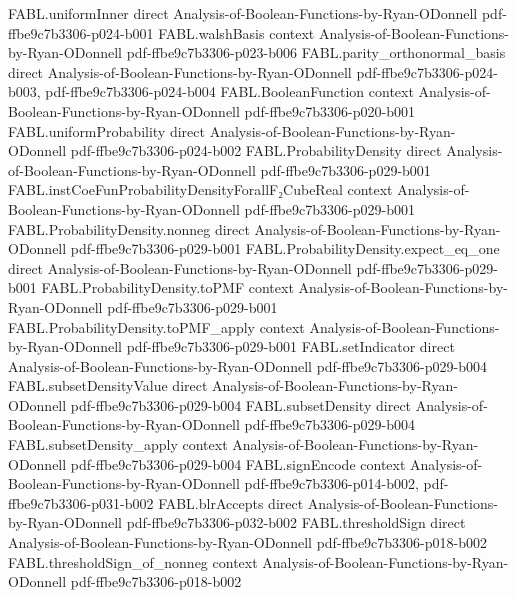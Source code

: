 \begin{theorem}
\proofstep
  {FABL.uniformInner}
  {direct}
  {Analysis-of-Boolean-Functions-by-Ryan-ODonnell}
  {pdf-ffbe9c7b3306-p024-b001}
\proofstep
  {FABL.walshBasis}
  {context}
  {Analysis-of-Boolean-Functions-by-Ryan-ODonnell}
  {pdf-ffbe9c7b3306-p023-b006}
\proofstep
  {FABL.parity_orthonormal_basis}
  {direct}
  {Analysis-of-Boolean-Functions-by-Ryan-ODonnell}
  {pdf-ffbe9c7b3306-p024-b003,
    pdf-ffbe9c7b3306-p024-b004}
\proofstep
  {FABL.BooleanFunction}
  {context}
  {Analysis-of-Boolean-Functions-by-Ryan-ODonnell}
  {pdf-ffbe9c7b3306-p020-b001}
\proofstep
  {FABL.uniformProbability}
  {direct}
  {Analysis-of-Boolean-Functions-by-Ryan-ODonnell}
  {pdf-ffbe9c7b3306-p024-b002}
\proofstep
  {FABL.ProbabilityDensity}
  {direct}
  {Analysis-of-Boolean-Functions-by-Ryan-ODonnell}
  {pdf-ffbe9c7b3306-p029-b001}
\proofstep
  {FABL.instCoeFunProbabilityDensityForallF₂CubeReal}
  {context}
  {Analysis-of-Boolean-Functions-by-Ryan-ODonnell}
  {pdf-ffbe9c7b3306-p029-b001}
\proofstep
  {FABL.ProbabilityDensity.nonneg}
  {direct}
  {Analysis-of-Boolean-Functions-by-Ryan-ODonnell}
  {pdf-ffbe9c7b3306-p029-b001}
\proofstep
  {FABL.ProbabilityDensity.expect_eq_one}
  {direct}
  {Analysis-of-Boolean-Functions-by-Ryan-ODonnell}
  {pdf-ffbe9c7b3306-p029-b001}
\proofstep
  {FABL.ProbabilityDensity.toPMF}
  {context}
  {Analysis-of-Boolean-Functions-by-Ryan-ODonnell}
  {pdf-ffbe9c7b3306-p029-b001}
\proofstep
  {FABL.ProbabilityDensity.toPMF_apply}
  {context}
  {Analysis-of-Boolean-Functions-by-Ryan-ODonnell}
  {pdf-ffbe9c7b3306-p029-b001}
\proofstep
  {FABL.setIndicator}
  {direct}
  {Analysis-of-Boolean-Functions-by-Ryan-ODonnell}
  {pdf-ffbe9c7b3306-p029-b004}
\proofstep
  {FABL.subsetDensityValue}
  {direct}
  {Analysis-of-Boolean-Functions-by-Ryan-ODonnell}
  {pdf-ffbe9c7b3306-p029-b004}
\proofstep
  {FABL.subsetDensity}
  {direct}
  {Analysis-of-Boolean-Functions-by-Ryan-ODonnell}
  {pdf-ffbe9c7b3306-p029-b004}
\proofstep
  {FABL.subsetDensity_apply}
  {context}
  {Analysis-of-Boolean-Functions-by-Ryan-ODonnell}
  {pdf-ffbe9c7b3306-p029-b004}
\proofstep
  {FABL.signEncode}
  {context}
  {Analysis-of-Boolean-Functions-by-Ryan-ODonnell}
  {pdf-ffbe9c7b3306-p014-b002,
    pdf-ffbe9c7b3306-p031-b002}
\proofstep
  {FABL.blrAccepts}
  {direct}
  {Analysis-of-Boolean-Functions-by-Ryan-ODonnell}
  {pdf-ffbe9c7b3306-p032-b002}
\proofstep
  {FABL.thresholdSign}
  {direct}
  {Analysis-of-Boolean-Functions-by-Ryan-ODonnell}
  {pdf-ffbe9c7b3306-p018-b002}
\proofstep
  {FABL.thresholdSign_of_nonneg}
  {context}
  {Analysis-of-Boolean-Functions-by-Ryan-ODonnell}
  {pdf-ffbe9c7b3306-p018-b002}

\end{theorem}
